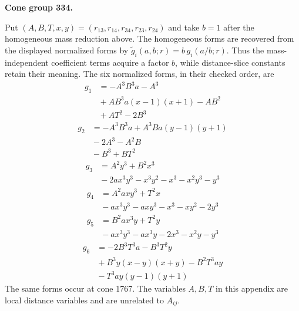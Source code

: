 \documentclass[11pt]{amsart}
\newcommand{\topic}[1]{\par\addvspace{1.4ex}\noindent\textbf{#1}\par\nobreak\smallskip\noindent}
\theoremstyle{definition}\newtheorem{definition}[theorem]{Definition}\theoremstyle{remark}\newtheorem{remark}[theorem]{Remark}
\begin{document}
\topic{Cone group 334.} Put $(A,B,T,x,y)=(r_{13},r_{14},r_{34},r_{23},r_{24})$ and take $b=1$ after the homogeneous mass reduction above. The homogeneous forms are recovered from the displayed normalized forms by $\widetilde g_i(a,b;r)=b\,g_i(a/b;r)$. Thus the mass-independent coefficient terms acquire a factor $b$, while distance-slice constants retain their meaning. The six normalized forms, in their checked order, are
\[
\begin{aligned} g_{1}&=- A^{3} B^{3} a -  A^{3}\\ &{}+ A B^{3} a \left(x - 1\right) \left(x + 1\right) -  A B^{2}\\ &{}+ A T^{2} -  2 B^{3}\end{aligned}
\]
\[
\begin{aligned} g_{2}&=- A^{3} B^{3} a + A^{3} B a \left(y - 1\right) \left(y + 1\right)\\ &{}-  2 A^{3} -  A^{2} B\\ &{}-  B^{3} + B T^{2}\end{aligned}
\]
\[
\begin{aligned} g_{3}&=A^{2} y^{3} + B^{2} x^{3}\\ &{}-  2 a x^{3} y^{3} - x^{3} y^{2} - x^{3} - x^{2} y^{3} - y^{3}\end{aligned}
\]
\[
\begin{aligned} g_{4}&=A^{2} a x y^{3} + T^{2} x\\ &{}-  a x^{3} y^{3} - a x y^{3} - x^{3} - x y^{2} - 2 y^{3}\end{aligned}
\]
\[
\begin{aligned} g_{5}&=B^{2} a x^{3} y + T^{2} y\\ &{}-  a x^{3} y^{3} - a x^{3} y - 2 x^{3} - x^{2} y - y^{3}\end{aligned}
\]
\[
\begin{aligned} g_{6}&=- 2 B^{3} T^{3} a -  B^{3} T^{2} y\\ &{}+ B^{3} y \left(x - y\right) \left(x + y\right) -  B^{2} T^{3} a y\\ &{}-  T^{3} a y \left(y - 1\right) \left(y + 1\right)\end{aligned}
\]
The same forms occur at cone 1767. The variables $A,B,T$ in this appendix are local distance variables and are unrelated to $A_{ij}$.
\end{document}

